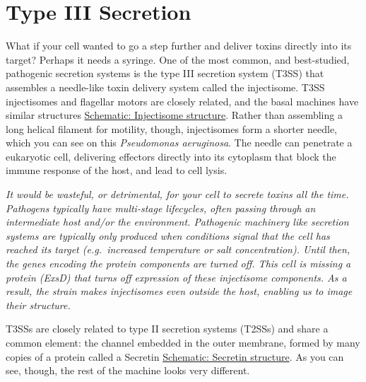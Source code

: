 \documentclass[]{tufte-book}
\begin{document}
\section{Type III Secretion}\label{type-iii-secretion}

What if your cell wanted to go a step further and deliver toxins
directly into its target? Perhaps it needs a syringe. One of the most
common, and best-studied, pathogenic secretion systems is the type III
secretion system (T3SS) that assembles a needle-like toxin delivery
system called the injectisome. T3SS injectisomes and flagellar motors
are closely related, and the basal machines have similar structures
\protect\hyperlink{Injectisome_structure}{Schematic: Injectisome
structure}. Rather than assembling a long helical filament for motility,
though, injectisomes form a shorter needle, which you can see on this
\emph{Pseudomonas aeruginosa}. The needle can penetrate a eukaryotic
cell, delivering effectors directly into its cytoplasm that block the
immune response of the host, and lead to cell lysis.

\emph{It would be wasteful, or detrimental, for your cell to secrete
toxins all the time. Pathogens typically have multi-stage lifecycles,
often passing through an intermediate host and/or the environment.
Pathogenic machinery like secretion systems are typically only produced
when conditions signal that the cell has reached its target
(e.g.~increased temperature or salt concentration). Until then, the
genes encoding the protein components are turned off. This cell is
missing a protein (ExsD) that turns off expression of these injectisome
components. As a result, the strain makes injectisomes even outside the
host, enabling us to image their structure.}

T3SSs are closely related to type II secretion systems (T2SSs) and share
a common element: the channel embedded in the outer membrane, formed by
many copies of a protein called a Secretin
\protect\hyperlink{Secretin_structure}{Schematic: Secretin structure}.
As you can see, though, the rest of the machine looks very different.
\end{document}
